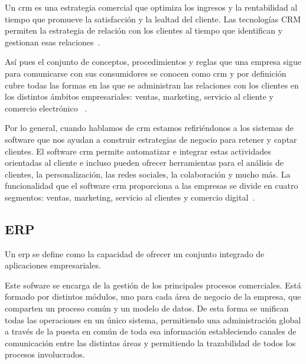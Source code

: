 Un \acrfull{crm} es una estrategia comercial que optimiza los ingresos y la rentabilidad al tiempo que promueve la satisfacción y la lealtad del cliente. Las tecnologías CRM permiten la estrategia de relación con los clientes al tiempo que identifican y gestionan esas relaciones~\cite{GartnerCRM}. 

Así pues el conjunto de conceptos, procedimientos y reglas que una empresa sigue para comunicarse con sus consumidores se conocen como  \acrshort{crm} y por definición cubre todas las formas en las que se administran las relaciones con los clientes en los distintos ámbitos empresariales: ventas, marketing, servicio al cliente y comercio electrónico~\cite{SAP-CRM} . 

Por lo general, cuando hablamos de \acrshort{crm} estamos refiriéndonos a los sistemas de software que nos ayudan a construir estrategias de negocio para retener y captar clientes.
El software \acrfull{crm} permite automatizar e integrar estas actividades orientadas al cliente e incluso pueden ofrecer herramientas para el análisis de clientes, la personalización, las redes sociales, la colaboración y mucho más. La funcionalidad que el software \acrshort{crm} proporciona a las empresas se divide en cuatro segmentos: ventas, marketing, servicio al clientes y comercio digital~\cite{GartnerCRM}. 


\subsection{ERP}
\label{sec:erp}
Un \acrfull{erp} se define como la capacidad de ofrecer un conjunto integrado de aplicaciones empresariales\cite{GartnerERP}. 


Este sofware se encarga de la gestión de los principales procesos comerciales. Está formado por distintos módulos, uno para cada área de negocio de la empresa, que comparten un proceso común y un modelo de datos. De esta forma se unifican todas las operaciones en un único sistema, permitiendo una administración global a través de la puesta en común de toda esa información estableciendo canales de comunicación entre las distintas áreas y permitiendo la trazabilidad de todos los procesos involucrados. 

